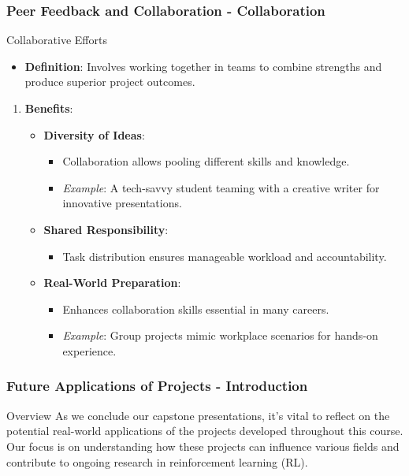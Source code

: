 \documentclass{beamer}
\begin{document}
\begin{frame}[fragile]
    \frametitle{Peer Feedback and Collaboration - Collaboration}
    \begin{block}{Collaborative Efforts}
        \begin{itemize}
            \item \textbf{Definition}: Involves working together in teams to combine strengths and produce superior project outcomes.
        \end{itemize}
        
        \begin{enumerate}
            \item \textbf{Benefits}:
                \begin{itemize}
                    \item \textbf{Diversity of Ideas}:
                        \begin{itemize}
                            \item Collaboration allows pooling different skills and knowledge.
                            \item \textit{Example}: A tech-savvy student teaming with a creative writer for innovative presentations.
                        \end{itemize}
                    \item \textbf{Shared Responsibility}:
                        \begin{itemize}
                            \item Task distribution ensures manageable workload and accountability.
                        \end{itemize}
                    \item \textbf{Real-World Preparation}:
                        \begin{itemize}
                            \item Enhances collaboration skills essential in many careers.
                            \item \textit{Example}: Group projects mimic workplace scenarios for hands-on experience.
                        \end{itemize}
                \end{itemize}
        \end{enumerate}
    \end{block}
\end{frame}

\begin{frame}[fragile]
    \frametitle{Future Applications of Projects - Introduction}
    \begin{block}{Overview}
        As we conclude our capstone presentations, it's vital to reflect on the potential real-world applications of the projects developed throughout this course. 
        Our focus is on understanding how these projects can influence various fields and contribute to ongoing research in reinforcement learning (RL).
    \end{block}
\end{frame}
\end{document}
